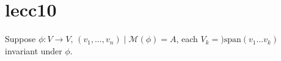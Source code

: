 \documentclass{article}
\begin{document}

\section{lecc10}




Suppose \( \phi  : V \to  V, \, (v_{1},\ldots ,v_n) \mid  \mathscr{M} (\phi )=A \), each \( V_k=)\text{span}(v_{1}\ldots v_k) \) invariant under \( \phi  \). 
\end{document}
